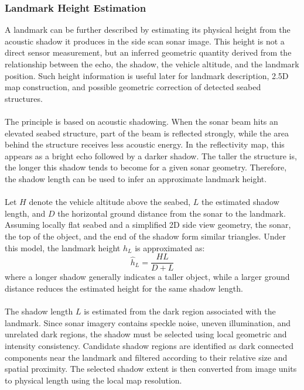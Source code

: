 \newpage



\subsubsection{Landmark Height Estimation}
A landmark can be further described by estimating its physical height from the acoustic shadow it produces in the side scan sonar image. This height is not a direct sensor measurement, but an inferred geometric quantity derived from the relationship between the echo, the shadow, the vehicle altitude, and the landmark position. Such height information is useful later for landmark description, 2.5D map construction, and possible geometric correction of detected seabed structures.
\\ \\
The principle is based on acoustic shadowing. When the sonar beam hits an elevated seabed structure, part of the beam is reflected strongly, while the area behind the structure receives less acoustic energy. In the reflectivity map, this appears as a bright echo followed by a darker shadow. The taller the structure is, the longer this shadow tends to become for a given sonar geometry. Therefore, the shadow length can be used to infer an approximate landmark height.
\\ \\
Let $H$ denote the vehicle altitude above the seabed, $L$ the estimated shadow length, and $D$ the horizontal ground distance from the sonar to the landmark. Assuming locally flat seabed and a simplified 2D side view geometry, the sonar, the top of the object, and the end of the shadow form similar triangles. Under this model, the landmark height $\hat{h}_L$ is approximated as:
\begin{equation}
    \hat{h}_L = \frac{H L}{D + L}
    \label{eq:local-map-generation-landmark-height}
\end{equation}
where a longer shadow generally indicates a taller object, while a larger ground distance reduces the estimated height for the same shadow length.
\\ \\
The shadow length $L$ is estimated from the dark region associated with the landmark. Since sonar imagery contains speckle noise, uneven illumination, and unrelated dark regions, the shadow must be selected using local geometric and intensity consistency. Candidate shadow regions are identified as dark connected components near the landmark and filtered according to their relative size and spatial proximity. The selected shadow extent is then converted from image units to physical length using the local map resolution.
